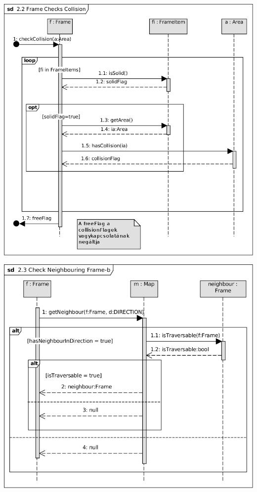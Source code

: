 \begin{center}\includegraphics[scale=1]{resources/22FrameChecksCollision.png}\end{center}
\begin{center}\includegraphics[scale=1]{resources/23CheckNeighbouringFrame.png}\end{center}
